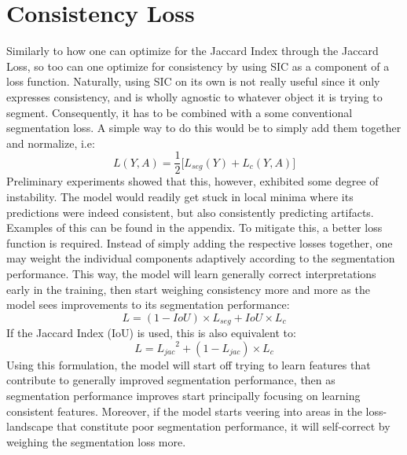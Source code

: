 \section{Consistency Loss}
Similarly to how one can optimize for the Jaccard Index through the Jaccard Loss, so too can one optimize for consistency by using SIC as a component of a loss function. Naturally, using SIC on its own is not really useful since it only expresses consistency, and is wholly agnostic to whatever object it is trying to segment. Consequently, it has to be combined with a some conventional segmentation loss. A simple way to do this would be to simply add them together and normalize, i.e:
\begin{equation*}
    L(Y, A) = \frac{1}{2} \big[L_{seg}(Y)+L_c(Y,A)\big]
\end{equation*}
Preliminary experiments showed that this, however, exhibited some degree of instability. The model would readily get stuck in local minima where its predictions were indeed consistent, but also consistently predicting artifacts. Examples of this can be found in the appendix. To mitigate this, a better loss function is required. Instead of simply adding the respective losses together, one may weight the individual components adaptively according to the segmentation performance. This way, the model will learn generally correct interpretations early in the training, then start weighing consistency more and more as the model sees improvements to its segmentation performance:
    \begin{equation}
        L = (1-IoU)\times L_{seg} + IoU \times L_c
    \end{equation}
        If the Jaccard Index (IoU) is used, this is also equivalent to:
    \begin{equation}
        L = {L_{jac}}^2 + (1-L_{jac})\times L_c
    \end{equation}
Using this formulation, the model will start off trying to learn features that contribute to generally improved segmentation performance, then as segmentation performance improves start principally focusing on learning consistent features. Moreover, if the model starts veering into areas in the loss-landscape that constitute poor segmentation performance, it will self-correct by weighing the segmentation loss more. 

